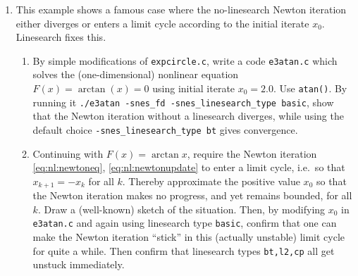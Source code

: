 \begin{enumerate}
\item This example shows a famous case where the no-linesearch Newton iteration either diverges or enters a limit cycle according to the initial iterate $x_0$.  Linesearch fixes this.
    \begin{enumerate}
    \item By simple modifications of \texttt{expcircle.c}, write a code \texttt{e3atan.c} which solves the (one-dimensional) nonlinear equation $F(x)=\arctan(x)=0$ using initial iterate $x_0=2.0$.  Use \texttt{atan()}.  By running it \texttt{./e3atan -snes\_fd -snes\_linesearch\_type basic}, show that the Newton iteration without a linesearch diverges, while using the default choice \texttt{-snes\_linesearch\_type bt} gives convergence.
    \item Continuing with $F(x)=\arctan x$, require the Newton iteration \eqref{eq:nl:newtoneq}, \eqref{eq:nl:newtonupdate} to enter a limit cycle, i.e.~so that $x_{k+1} = - x_k$ for all $k$.  Thereby approximate the positive value $x_0$ so that the Newton iteration makes no progress, and yet remains bounded, for all $k$.  Draw a (well-known) sketch of the situation.  Then, by modifying $x_0$ in \texttt{e3atan.c} and again using linesearch type \texttt{basic}, confirm that one can make the Newton iteration ``stick'' in this (actually unstable) limit cycle for quite a while.  Then confirm that linesearch types \texttt{bt,l2,cp} all get unstuck immediately.

    \end{enumerate}

\end{enumerate}